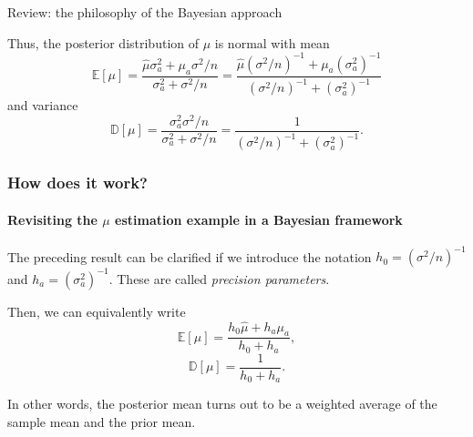 \documentclass[10pt]{beamer}
\theoremstyle{definition}
\begin{document}
\begin{section}{Review: the philosophy of the Bayesian approach}
\begin{frame}[fragile]
Thus, the posterior distribution of $\mu$ is normal with mean
$$\mathbb{E}[\mu]=\frac{\hat{\mu}\sigma^2_a+\mu_a\sigma^2/n}{\sigma^2_a+\sigma^2/n}=\frac{\hat{\mu}(\sigma^2/n)^{-1}+\mu_a(\sigma_a^2)^{-1}}{(\sigma^2/n)^{-1}+(\sigma^2_a)^{-1}}$$
and variance
$$\mathbb{D}[\mu]=\frac{\sigma^2_a\sigma^2/n}{\sigma^2_a+\sigma^2/n}=\frac{1}{(\sigma^2/n)^{-1}+(\sigma^2_a)^{-1}}.$$
\end{frame}

\begin{frame}[fragile]
\frametitle{How does it work?}
\framesubtitle{Revisiting the $ \mu $ estimation example in a Bayesian framework}
The preceding result can be clarified if we introduce the notation $h_0=(\sigma^2/n)^{-1}$ and $h_a=(\sigma^2_a)^{-1}$. These are called \emph{precision parameters}. \bigskip

Then, we can equivalently write 
\[ \mathbb{E}[\mu]=\dfrac{h_0\hat{\mu}+h_a\mu_a}{h_0+h_a}, \]  \[ \mathbb{D}[\mu]=\frac{1}{h_0+h_a}. \]\bigskip

In other words, the posterior mean turns out to be a weighted average of the sample mean and the prior mean.
\end{frame}
\end{section}
\end{document}
